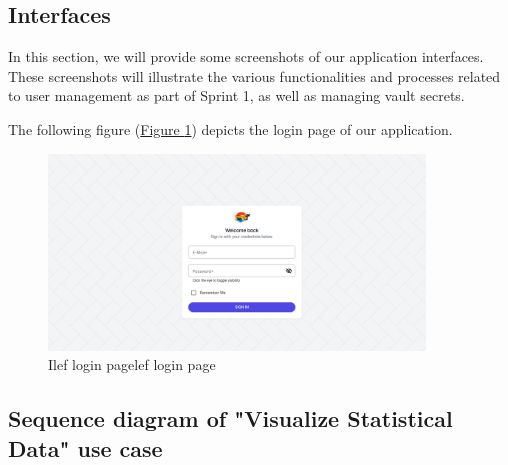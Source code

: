\subsection{Interfaces}
In this section, we will provide some screenshots of our application interfaces. These screenshots will illustrate the various functionalities and processes related to user management as part of Sprint 1, as well as managing vault secrets. 

The following figure (\hyperref[fig:login]{Figure \ref{fig:login}})  depicts the login page of our application.
\begin{figure}[h]
  \center
  \includegraphics[width=10cm]{./chapters/sprint1/login.png}
  \caption{Ilef login pagelef login page}
  \label{fig:login}
\end{figure}

\subsection{Sequence diagram of "Visualize Statistical Data" use case}

